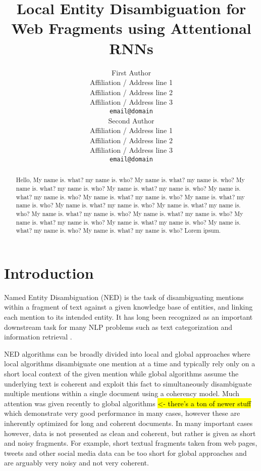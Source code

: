\documentclass[11pt]{article}
\title{Local Entity Disambiguation for Web Fragments using Attentional RNNs}
\author{First Author \\
  Affiliation / Address line 1 \\
  Affiliation / Address line 2 \\
  Affiliation / Address line 3 \\
  {\tt email@domain} \\\And
  Second Author \\
  Affiliation / Address line 1 \\
  Affiliation / Address line 2 \\
  Affiliation / Address line 3 \\
  {\tt email@domain} \\}
\date{}
\begin{document}
\maketitle
\begin{abstract}
Hello, My name is. what? my name is. who?
My name is. what? my name is. who?
My name is. what? my name is. who?
My name is. what? my name is. who?
My name is. what? my name is. who?
My name is. what? my name is. who?
My name is. what? my name is. who?
My name is. what? my name is. who?
My name is. what? my name is. who?
My name is. what? my name is. who?
My name is. what? my name is. who?
My name is. what? my name is. who?
My name is. what? my name is. who?
My name is. what? my name is. who?
My name is. what? my name is. who? Lorem ipsum.
\end{abstract}

\section{Introduction}

Named Entity Disambiguation (NED) is the task of disambiguating mentions within a fragment of text against a given knowledge base of entities, and linking each mention to its intended entity. It has long been recognized as an important downstream task for many NLP problems such as text categorization \cite{gabrilovich2007computing} and information retrieval \cite{dalton2014entity}. 

NED algorithms can be broadly divided into local and global approaches where local algorithms disambiguate one mention at a time and typically rely only on a short local context of the given mention while global algorithms assume the underlying text is coherent and exploit this fact to simultaneously disambiguate multiple mentions within a single document using a coherency model. Much attention was given recently to global algorithms \cite{ratinov2011local,guo2014entity,pershina2015personalized} \hl{<- there's a ton of newer stuff} which demonstrate very good performance in many cases, however these are inherently optimized for long and coherent documents. In many important cases however, data is not presented as clean and coherent, but rather is given as short and noisy fragments. For example, short textual fragments taken from web pages, tweets and other social media data can be too short for global approaches and are arguably very noisy and not very coherent. 
\end{document}

